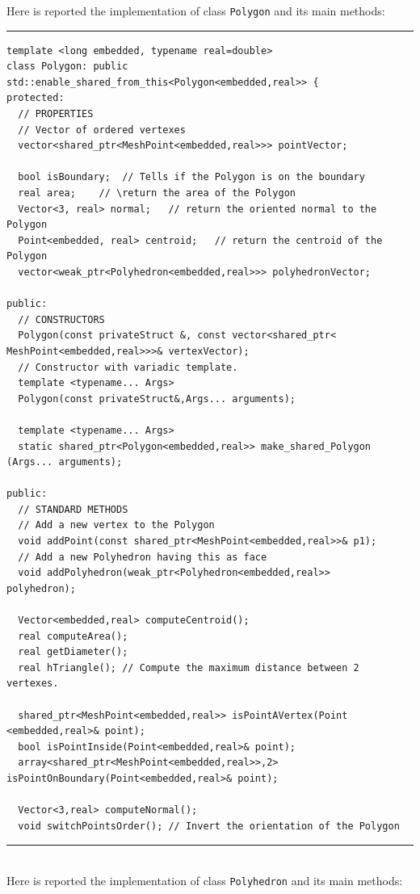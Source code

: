 Here is reported the implementation of class \verb|Polygon| and its main methods:\\

\noindent\rule{16cm}{1pt}
\begin{lstlisting}[caption=File \texttt{Polygon.h}]
template <long embedded, typename real=double>
class Polygon: public std::enable_shared_from_this<Polygon<embedded,real>> {
protected:
  // PROPERTIES
  // Vector of ordered vertexes
  vector<shared_ptr<MeshPoint<embedded,real>>> pointVector;
	
  bool isBoundary;	// Tells if the Polygon is on the boundary
  real area;	// \return the area of the Polygon
  Vector<3, real> normal;	// return the oriented normal to the Polygon
  Point<embedded, real> centroid;	// return the centroid of the Polygon
  vector<weak_ptr<Polyhedron<embedded,real>>> polyhedronVector;

public:
  // CONSTRUCTORS
  Polygon(const privateStruct &, const vector<shared_ptr<
MeshPoint<embedded,real>>>& vertexVector);
  // Constructor with variadic template.
  template <typename... Args>
  Polygon(const privateStruct&,Args... arguments);

  template <typename... Args>
  static shared_ptr<Polygon<embedded,real>> make_shared_Polygon
(Args... arguments);

public:
  // STANDARD METHODS
  // Add a new vertex to the Polygon
  void addPoint(const shared_ptr<MeshPoint<embedded,real>>& p1); 
  // Add a new Polyhedron having this as face
  void addPolyhedron(weak_ptr<Polyhedron<embedded,real>> 
polyhedron);	
			
  Vector<embedded,real> computeCentroid();
  real computeArea();
  real getDiameter();
  real hTriangle(); // Compute the maximum distance between 2 vertexes.

  shared_ptr<MeshPoint<embedded,real>> isPointAVertex(Point
<embedded,real>& point);	
  bool isPointInside(Point<embedded,real>& point);
  array<shared_ptr<MeshPoint<embedded,real>>,2> 
isPointOnBoundary(Point<embedded,real>& point);

  Vector<3,real> computeNormal();
  void switchPointsOrder(); // Invert the orientation of the Polygon
\end{lstlisting}

\noindent\rule{16cm}{1pt}\\

Here is reported the implementation of class \verb|Polyhedron| and its main methods:

